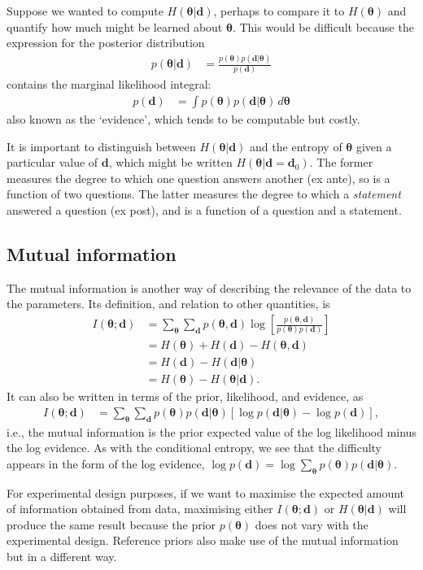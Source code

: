 \documentclass[entropy,article,accept,oneauthor,pdftex,10pt,a4paper]{mdpi}
\renewcommand{\d}{\boldsymbol{d}}
\newcommand{\x}{\boldsymbol{\theta}}
\begin{document}
Suppose we wanted to compute $H(\x | \d)$, perhaps to compare it to
$H(\x)$ and quantify how much might be learned about $\x$.
This would be difficult because the expression
for the posterior distribution
\begin{align}
p(\x | \d) &= \frac{p(\x)p(\d | \x)}{p(\d)}
\end{align}
contains the marginal likelihood integral:
\begin{align}
p(\d) &= \int p(\x) p(\d | \x) \, d\x
\end{align}
also known as the `evidence', which tends to be computable but costly.

It is important to distinguish between $H(\x | \d)$ and the
entropy of $\x$ given a particular value of $\d$, which might be written
$H(\x | \d=\d_0)$.
The former measures the degree to which one question answers
another (ex ante), so is a function of two questions. The latter measures the
degree to which a {\em statement} answered a question (ex post),
and is a function of a question and a statement.

\subsection{Mutual information}
The mutual information is another way of describing the relevance of the
data to the parameters. Its definition, and relation to other quantities, is
\begin{align}
I(\x; \d) &= \sum_{\x} \sum_{\d} p(\x, \d)
                       \log\left[\frac{p(\x, \d)}{p(\x)p(\d)}\right]\\
           &= H(\x) + H(\d) - H(\x, \d)\\
           &= H(\d) - H(\d | \x)\\
           &= H(\x) - H(\x | \d).
\end{align}
It can also be written in terms of the prior, likelihood, and evidence,
as
\begin{align}
I(\x; \d) &= \sum_{\x} \sum_{\d} p(\x)p(\d | \x)
              \left[\log p(\d | \x) - \log p(\d)\right],
\end{align}
i.e., the mutual information is the prior expected value of the
log likelihood minus the log evidence.
As with the conditional entropy, we see that the difficulty appears in the
form of the log evidence,
$\log p(\d) = \log \sum_{\x} p(\x)p(\d | \x)$.

For experimental design purposes, if we want to maximise the expected amount
of information obtained from data, maximising either $I(\x; \d)$ or
$H(\x | \d)$ will produce the same result because the prior $p(\x)$ does not
vary with the experimental design. Reference priors
\citep{bernardo2005reference} also make use of the mutual information but in a
different way.
\end{document}
